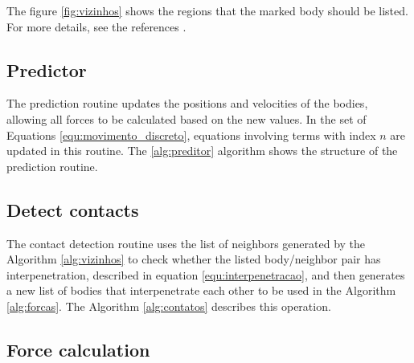     The figure \ref{fig:vizinhos} shows the regions that the marked body should be listed. For more details, see the references \cite{Dissertacao, Computer_Simulation_of_Liquids}. 

\subsection{Predictor}

    The prediction routine updates the positions and velocities of the bodies, allowing all forces to be calculated based on the new values. In the set of Equations \ref{equ:movimento_discreto}, equations involving terms with index $n$ are updated in this routine. The \ref{alg:preditor} algorithm shows the structure of the prediction routine.



\subsection{Detect contacts}

    The contact detection routine uses the list of neighbors generated by the Algorithm \ref{alg:vizinhos} to check whether the listed body/neighbor pair has interpenetration, described in equation \ref{equ:interpenetracao}, and then generates a new list of bodies that interpenetrate each other to be used in the Algorithm \ref{alg:forcas}. The Algorithm \ref{alg:contatos} describes this operation.



\subsection{Force calculation}

